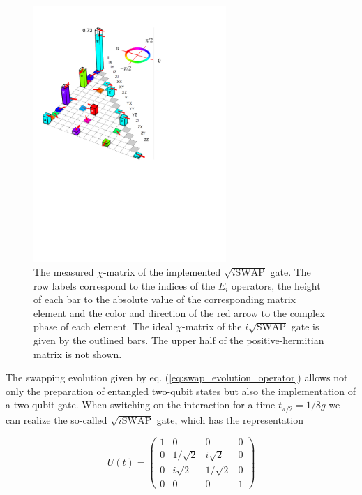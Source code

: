\begin{figure}
		\includegraphics[width=0.65\textwidth]{./material/papers/iswap/figures/chi_matrix}
	\caption[Measured $\chi$-matrix of the $\sqrt{i\textrm{SWAP}}$ gate]{The measured $\chi$-matrix of the implemented $\sqrt{i\mathrm{SWAP}}$ gate. The row labels correspond to the indices of the $E_i$ operators, the height of each bar to the absolute value of the corresponding matrix element and the color and direction of the red arrow to the complex phase of each element. The ideal $\chi$-matrix of the $i\sqrt{\mathrm{SWAP}}$ gate is given by the outlined bars. The upper half of the positive-hermitian matrix is not shown.}
	\label{fig:gate_chi_matrix_and_errors}
\end{figure}

The swapping evolution given by eq. (\ref{eq:swap_evolution_operator}) allows not only the preparation of entangled two-qubit states but also the implementation of a two-qubit gate. When switching on the interaction for a time $t_{\pi/2} = 1/8g$ we can realize the so-called $\sqrt{i\mathrm{SWAP}}$ gate, which has the representation

\begin{equation}
	U(t)  =  \left( \begin{array}{cccc} 1 & 0 & 0 & 0 \\ 0 & 1/\sqrt{2} & i\sqrt{2} & 0 \\ 0 & i\sqrt{2} & 1/\sqrt{2} & 0 \\ 0 & 0 & 0 & 1 \end{array} \right) \label{eq:sqrt_iswap_gate}
\end{equation}

